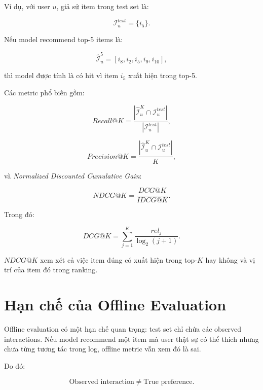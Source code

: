 \documentclass[12pt,a4paper]{article}
\begin{document}
Ví dụ, với user $u$, giả sử item trong test set là:

\begin{equation}
\mathcal{I}^{test}_u = \{i_5\}.
\end{equation}

Nếu model recommend top-5 items là:

\begin{equation}
\hat{\mathcal{I}}^5_u = [i_8, i_2, i_5, i_9, i_{10}],
\end{equation}

thì model được tính là có hit vì item $i_5$ xuất hiện trong top-5.

Các metric phổ biến gồm:

\begin{equation}
Recall@K = \frac{|\hat{\mathcal{I}}^K_u \cap \mathcal{I}^{test}_u|}{|\mathcal{I}^{test}_u|},
\end{equation}

\begin{equation}
Precision@K = \frac{|\hat{\mathcal{I}}^K_u \cap \mathcal{I}^{test}_u|}{K},
\end{equation}

và \textit{Normalized Discounted Cumulative Gain}:

\begin{equation}
NDCG@K = \frac{DCG@K}{IDCG@K}.
\end{equation}

Trong đó:

\begin{equation}
DCG@K = \sum_{j=1}^{K} \frac{rel_j}{\log_2(j+1)}.
\end{equation}

$NDCG@K$ xem xét cả việc item đúng có xuất hiện trong top-$K$ hay không và vị trí của item đó trong ranking.

\section{Hạn chế của Offline Evaluation}

Offline evaluation có một hạn chế quan trọng: test set chỉ chứa các observed interactions. Nếu model recommend một item mà user thật sự có thể thích nhưng chưa từng tương tác trong log, offline metric vẫn xem đó là sai.

Do đó:

\begin{equation}
\text{Observed interaction} \neq \text{True preference}.
\end{equation}
\end{document}
